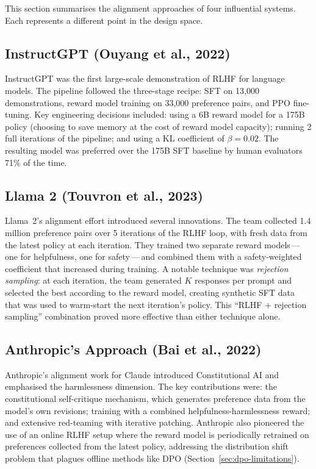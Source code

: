 This section summarises the alignment approaches of four influential systems. Each represents a different point in the design space.

\subsection{InstructGPT (Ouyang et al., 2022)}

InstructGPT was the first large-scale demonstration of RLHF for language models. The pipeline followed the three-stage recipe: SFT on 13{,}000 demonstrations, reward model training on 33{,}000 preference pairs, and PPO fine-tuning. Key engineering decisions included: using a 6B reward model for a 175B policy (choosing to save memory at the cost of reward model capacity); running 2 full iterations of the pipeline; and using a KL coefficient of $\beta = 0.02$. The resulting model was preferred over the 175B SFT baseline by human evaluators 71\% of the time.

\subsection{Llama 2 (Touvron et al., 2023)}

Llama~2's alignment effort introduced several innovations. The team collected 1.4 million preference pairs over 5 iterations of the RLHF loop, with fresh data from the latest policy at each iteration. They trained two separate reward models\,---\,one for helpfulness, one for safety\,---\,and combined them with a safety-weighted coefficient that increased during training. A notable technique was \emph{rejection sampling}: at each iteration, the team generated $K$ responses per prompt and selected the best according to the reward model, creating synthetic SFT data that was used to warm-start the next iteration's policy. This ``RLHF + rejection sampling'' combination proved more effective than either technique alone.

\subsection{Anthropic's Approach (Bai et al., 2022)}

Anthropic's alignment work for Claude introduced Constitutional AI and emphasised the harmlessness dimension. The key contributions were: the constitutional self-critique mechanism, which generates preference data from the model's own revisions; training with a combined helpfulness-harmlessness reward; and extensive red-teaming with iterative patching. Anthropic also pioneered the use of an online RLHF setup where the reward model is periodically retrained on preferences collected from the latest policy, addressing the distribution shift problem that plagues offline methods like DPO (Section~\ref{sec:dpo-limitations}).

